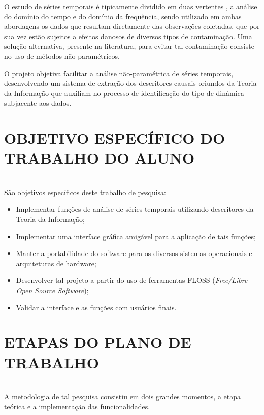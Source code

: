 \documentclass[12pt,letterpaper]{article}
\begin{document}
O estudo de séries temporais é tipicamente dividido em duas vertentes \cite{BrockwellDavis91}, a análise do domínio do tempo e do domínio da frequência, sendo utilizado em ambas abordagens os dados que resultam diretamente das observações coletadas, que por sua vez estão sujeitos a efeitos danosos de diversos tipos de contaminação. Uma solução alternativa, presente na literatura, para evitar tal contaminação consiste no uso de métodos não-paramétricos.

	O projeto objetiva facilitar a análise não-paramétrica de séries temporais, desenvolvendo um sistema de extração dos descritores causais oriundos da Teoria da Informação que auxiliam no processo de identificação do tipo de dinâmica subjacente aos dados.


\newpage
\section*{\centering \textbf{OBJETIVO ESPECÍFICO DO TRABALHO DO ALUNO}}
\hrulefill \\

São objetivos específicos deste trabalho de pesquisa:

\begin{itemize}
\item Implementar funções de análise de séries temporais utilizando descritores da Teoria da Informação;
\item Implementar uma interface gráfica amigável para a aplicação de tais funções;
\item Manter a portabilidade do software para os diversos sistemas operacionais e arquiteturas de hardware;
\item Desenvolver tal projeto a partir do uso de ferramentas FLOSS (\textit{Free/Libre Open Source Software});
\item Validar a interface e as funções com usuários finais.
\end{itemize}


\newpage
\section*{\centering \textbf{ETAPAS DO PLANO DE TRABALHO}}
\hrulefill \\

A metodologia de tal pesquisa consistiu em dois grandes momentos, a etapa teórica e a implementação das funcionalidades.
\end{document}
